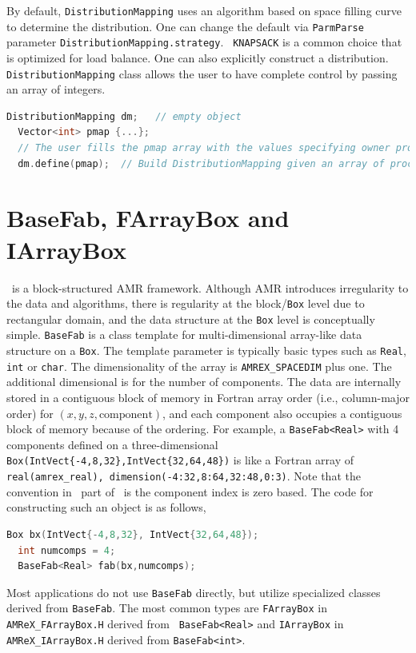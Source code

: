 {By default, {\tt DistributionMapping} uses an algorithm based on space
filling curve to determine the distribution.  One can change the default
via {\tt ParmParse} parameter {\tt DistributionMapping.strategy}.  {\tt
  KNAPSACK} is a common choice that is optimized for load balance.
One can also explicitly construct a distribution.
{\tt DistributionMapping} class allows the user to have complete control by
passing an array of integers. 
\begin{lstlisting}[language=cpp]
  DistributionMapping dm;   // empty object
  Vector<int> pmap {...};
  // The user fills the pmap array with the values specifying owner processes
  dm.define(pmap);  // Build DistributionMapping given an array of process IDs.
\end{lstlisting}


\section{BaseFab, FArrayBox and IArrayBox}
\label{sec:basics:fab}

\amrex\ is a block-structured AMR framework.  Although AMR introduces
irregularity to the data and algorithms, there is regularity at the
block/{\tt Box} level due to rectangular domain, and the data structure
at the {\tt Box} level is conceptually simple.  {\tt BaseFab} is a
class template for multi-dimensional array-like data structure on a
{\tt Box}.  The template parameter is typically basic types such as
{\tt Real}, {\tt int} or {\tt char}.  The dimensionality of the array
is {\tt AMREX\_SPACEDIM} plus one.  The additional dimensional is for
the number of components.  The data are internally stored in a
contiguous block of memory in Fortran array order (i.e., column-major
order) for $(x,y,z,\mathrm{component})$, and each component also
occupies a contiguous block of memory because of the ordering.  For
example, a {\tt BaseFab<Real>} with 4 components defined on a
three-dimensional {\tt Box(IntVect\{-4,8,32\},IntVect\{32,64,48\})} is
like a Fortran array of {\tt real(amrex\_real),
  dimension(-4:32,8:64,32:48,0:3)}.  Note that the convention in \cpp\
part of \amrex\ is the component index is zero based.  The code for
constructing such an object is as follows,
\begin{lstlisting}[language=cpp]
  Box bx(IntVect{-4,8,32}, IntVect{32,64,48});
  int numcomps = 4;
  BaseFab<Real> fab(bx,numcomps);
\end{lstlisting}

Most applications do not use {\tt BaseFab} directly, but utilize
specialized classes derived from {\tt BaseFab}.  The most common types
are {\tt FArrayBox} in {\tt AMReX\_FArrayBox.H} derived from {\tt
  BaseFab<Real>} and {\tt IArrayBox} in {\tt AMReX\_IArrayBox.H}
derived from {\tt BaseFab<int>}.

}
